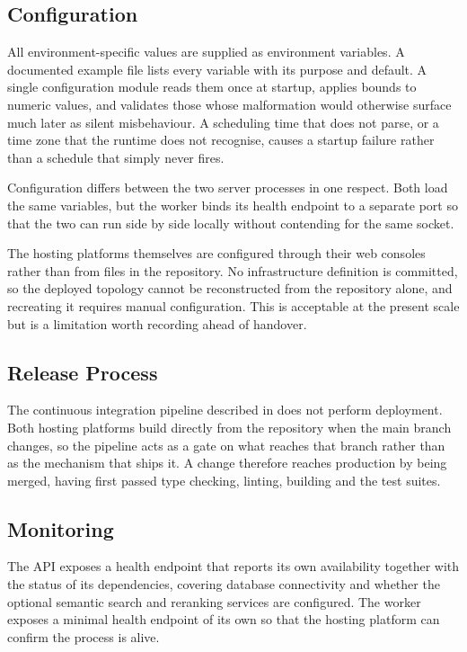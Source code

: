 \subsection{Configuration}
\label{subsec:configuration}

All environment-specific values are supplied as environment variables. A documented example file lists every variable
with its purpose and default. A single configuration module reads them once at
startup, applies bounds to numeric values, and validates those whose malformation
would otherwise surface much later as silent misbehaviour. A scheduling time that
does not parse, or a time zone that the runtime does not recognise, causes a
startup failure rather than a schedule that simply never fires.

Configuration differs between the two server processes in one respect. Both load
the same variables, but the worker binds its health endpoint to a separate port
so that the two can run side by side locally without contending for the same
socket.

The hosting platforms themselves are configured through their web consoles rather
than from files in the repository. No infrastructure definition is committed, so
the deployed topology cannot be reconstructed from the repository alone, and
recreating it requires manual configuration. This is acceptable at the present
scale but is a limitation worth recording ahead of handover.

\subsection{Release Process}
\label{subsec:release-process}

The continuous integration pipeline described in  does
not perform deployment. Both hosting platforms build directly from the repository
when the main branch changes, so the pipeline acts as a gate on what reaches that
branch rather than as the mechanism that ships it. A change therefore reaches
production by being merged, having first passed type checking, linting, building
and the test suites.

\subsection{Monitoring}
\label{subsec:monitoring}

The API exposes a health endpoint that reports its own availability together with
the status of its dependencies, covering database connectivity and whether the
optional semantic search and reranking services are configured. The worker
exposes a minimal health endpoint of its own so that the hosting platform can
confirm the process is alive.

